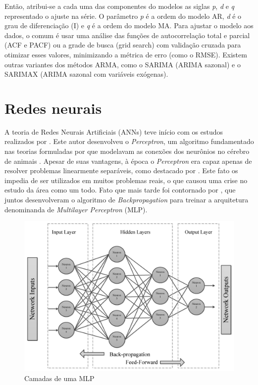Então, atribui-se a cada uma das componentes do modelos as siglas \textit{p}, \textit{d} e \textit{q} representado o ajuste na série. O parâmetro \textit{p} é a ordem do modelo AR, \textit{d} é o grau de diferenciação (I) e \textit{q} é a ordem do modelo MA.
Para ajustar o modelo aos dados, o comum é usar uma análise das funções de autocorrelação total e parcial (ACF e PACF) ou a grade de busca (grid search) com validação cruzada para otimizar esses valores, minimizando a métrica de erro (como o RMSE).
Existem outras variantes dos métodos ARMA, como o SARIMA (ARIMA sazonal) e o SARIMAX (ARIMA sazonal com variáveis exógenas).
\section{Redes neurais} \label{sec:redes neurais}

A teoria de Redes Neurais Artificiais (ANNs) teve início com os estudos realizados por \textcite{Rosenblatt}.
Este autor desenvolveu o \textit{Perceptron}, um algoritmo fundamentado nas teorias formuladas por \textcite{McCulloch, hebb} que modelavam as conexões dos neurônios no cérebro de animais \cite{Good}.
Apesar de suas vantagens, à época o \textit{Perceptron} era capaz apenas de resolver problemas linearmente separáveis, como destacado por \textcite{Minsky}. Este fato os impedia de ser utilizados em muitos problemas reais,
o que causou uma crise no estudo da área como um todo. Fato que mais tarde foi contornado por \textcite{Rumelhart}, que juntos desenvolveram o algoritmo de \textit{Backpropagation} para treinar a arquitetura denominanda de \textit{Multilayer Perceptron} (MLP).

\begin{figure}[!htb] \centering
  \caption{Camadas de uma MLP} \label{figura:multilayer}
  \begin{varwidth}{\linewidth}
    \includegraphics[width=12cm]{figuras/mlp.png}
  \end{varwidth}
\end{figure}

